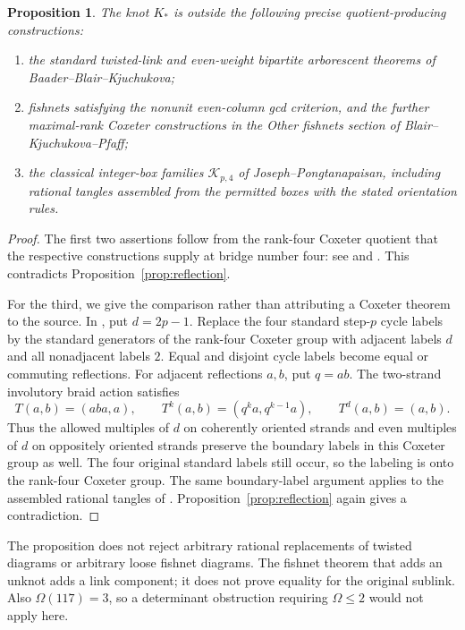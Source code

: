 \documentclass[11pt]{article}
\newtheorem{proposition}[theorem]{Proposition}
\begin{document}
\begin{proposition}\label{prop:coxeterfamilies}
The knot $K_*$ is outside the following precise quotient-producing
constructions:
\begin{enumerate}
\item the standard twisted-link and even-weight bipartite
arborescent theorems of Baader--Blair--Kjuchukova;
\item fishnets satisfying the nonunit even-column gcd criterion,
and the further maximal-rank Coxeter constructions in the
\emph{Other fishnets} section of Blair--Kjuchukova--Pfaff;
\item the classical integer-box families $\mathcal K_{p,4}$
of Joseph--Pongtanapaisan, including rational tangles assembled
from the permitted boxes with the stated orientation rules.
\end{enumerate}
\end{proposition}
\begin{proof}
The first two assertions follow from the rank-four Coxeter quotient
that the respective constructions supply at bridge number four:
see \cite[Theorems~1--2 and Section~4]{bbk} and
\cite[Proposition~1.4 and Sections~2.1--2.2]{fishnet}.
This contradicts Proposition~\ref{prop:reflection}.

For the third, we give the comparison rather than attributing a
Coxeter theorem to the source. In
\cite[Construction~3.5, Definition~3.6 and Corollary~3.12]{jp},
put $d=2p-1$. Replace the four standard step-$p$ cycle labels by
the standard generators of the rank-four Coxeter group with
adjacent labels $d$ and all nonadjacent labels $2$.
Equal and disjoint cycle labels become equal or commuting
reflections. For adjacent reflections $a,b$, put $q=ab$.
The two-strand involutory braid action satisfies
\[
 T(a,b)=(aba,a),\qquad
 T^k(a,b)=(q^ka,q^{k-1}a),\qquad T^d(a,b)=(a,b).
\]
Thus the allowed multiples of $d$ on coherently oriented strands
and even multiples of $d$ on oppositely oriented strands preserve the
boundary labels in this Coxeter group as well.
The four original standard labels still occur, so the labeling
is onto the rank-four Coxeter group.
The same boundary-label argument applies to the assembled
rational tangles of \cite[Remark~3.11 and Figure~5]{jp}.
Proposition~\ref{prop:reflection} again gives a contradiction.
\end{proof}

The proposition does not reject arbitrary rational replacements
of twisted diagrams or arbitrary loose fishnet diagrams.
The fishnet theorem that adds an unknot adds a link component;
it does not prove equality for the original sublink.
Also $\Omega(117)=3$, so a determinant obstruction requiring
$\Omega\le2$ would not apply here.
\end{document}
